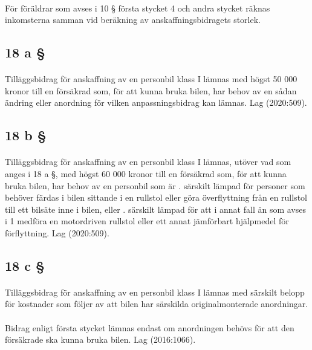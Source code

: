 \documentclass[a4paper,notitlepage,openany,10pt]{book}
\begin{document}
\paragraph*{}
För föräldrar som avses i 10 § första stycket 4 och andra stycket räknas inkomsterna samman vid beräkning av anskaffningsbidragets storlek.
\subsection*{18 a §}
\paragraph*{}
Tilläggsbidrag för anskaffning av en personbil klass I lämnas med högst 50 000 kronor till en försäkrad som, för att kunna bruka bilen, har behov av en sådan ändring eller anordning för vilken anpassningsbidrag kan lämnas.
Lag (2020:509).
\subsection*{18 b §}
\paragraph*{}
Tilläggsbidrag för anskaffning av en personbil klass I lämnas, utöver vad som anges i 18 a §, med högst 60 000 kronor till en försäkrad som, för att kunna bruka bilen, har behov av en personbil som är
. särskilt lämpad för personer som behöver färdas i bilen sittande i en rullstol eller göra överflyttning från en rullstol till ett bilsäte inne i bilen, eller
. särskilt lämpad för att i annat fall än som avses i 1 medföra en motordriven rullstol eller ett annat jämförbart hjälpmedel för förflyttning.
Lag (2020:509).
\subsection*{18 c §}
\paragraph*{}
Tilläggsbidrag för anskaffning av en personbil klass I lämnas med särskilt belopp för kostnader som följer av att bilen har särskilda originalmonterade anordningar.
\paragraph*{}
Bidrag enligt första stycket lämnas endast om anordningen behövs för att den försäkrade ska kunna bruka bilen.
Lag (2016:1066).
\end{document}
